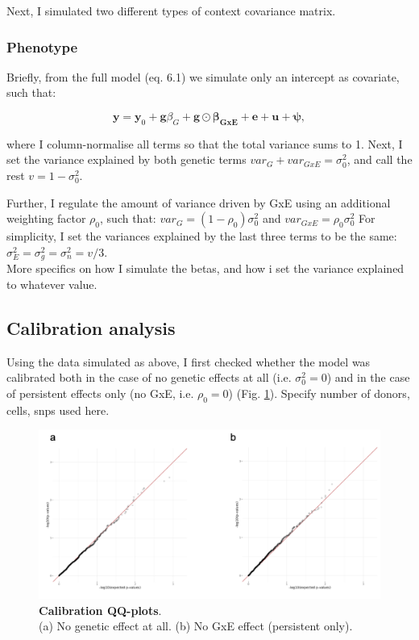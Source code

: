 Next, I simulated two different types of context covariance matrix.

\subsubsection{Phenotype}

Briefly, from the full model (eq. 6.1) we simulate only an intercept as covariate, such that:  

\begin{equation}
 \mathbf{y} = \mathbf{y}_0 + \mathbf{g}\beta_G + \mathbf{g} \odot \boldsymbol{\beta_{GxE}} + \mathbf{e} + \mathbf{u} + \boldsymbol{\psi}, 
\end{equation}

where I column-normalise all terms so that the total variance sums to 1.
Next, I set the variance explained by both genetic terms $var_G+var_{GxE}=\sigma_0^2$, and call the rest $v = 1-\sigma_0^2$.

Further, I regulate the amount of variance driven by GxE using an additional weighting factor $\rho_0$, such that: $var_G = (1-\rho_0)\sigma_0^2$ and $var_{GxE} = \rho_0\sigma_0^2$
For simplicity, I set the variances explained by the last three terms to be the same:
$\sigma_E^2 = \sigma_g^2 = \sigma_n^2 = v/3$. \\

More specifics on how I simulate the betas, and how i set the variance explained to whatever value.

\subsection{Calibration analysis}

Using the data simulated as above, I first checked whether the model was calibrated both in the case of no genetic effects at all (i.e. $\sigma_0^2 = 0$) and in the case of persistent effects only (no GxE, i.e. $\rho_0 = 0$) (Fig. \ref{fig:sc_structlmm_calibration}).
Specify number of donors, cells, snps used here.

\begin{figure}[h]
\centering
\includegraphics[width=15.5cm]{Chapter6/Fig/sc_structlmm_calibration.png}
\caption[Calibration QQ-plots]{\textbf{Calibration QQ-plots}.\\
(a) No genetic effect at all.
(b) No GxE effect (persistent only).}
\label{fig:sc_structlmm_calibration}
\end{figure}

